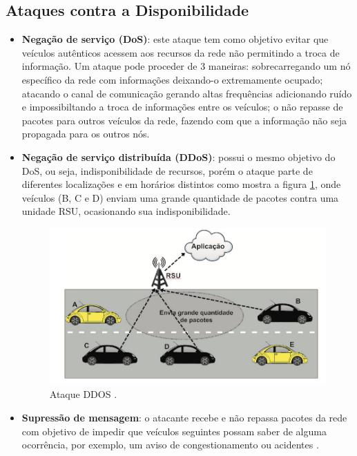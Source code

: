 \documentclass[
	12pt,				%
	oneside,			%
	a4paper,			%
	english,			%
	brazil				%
	]{abntex2ppgsi}
\begin{document}
\subsection{Ataques contra a Disponibilidade}
\begin{itemize}
	\item {\textbf{Negação de serviço (DoS)}: este ataque tem como objetivo evitar que veículos autênticos acessem aos recursos da rede não permitindo a troca de informação. Um ataque pode proceder de 3 maneiras: sobrecarregando um nó específico da rede com informações deixando-o extremamente ocupado; atacando o canal de comunicação gerando altas frequências adicionando ruído e impossibiltando a troca de informações entre os veículos; o não repasse de pacotes para outros veículos da rede, fazendo com que a informação não seja propagada para os outros nós}.
	
	\item {\textbf{Negação de serviço distribuída (DDoS)}: possui o mesmo objetivo do DoS, ou seja, indisponibilidade de recursos, porém o ataque parte de diferentes localizações e em horários distintos como mostra  a figura \ref{fig:ataqueddos}, onde veículos (B, C e D) enviam uma grande quantidade de pacotes contra uma unidade RSU, ocasionando sua indisponibilidade.}

\begin{figure}[h!]
	\centering
	\includegraphics [width=12cm] {images/ataqueddos.png}
	\caption{Ataque DDOS \cite{wanghamsegurancca}.}
	\label{fig:ataqueddos}
\end{figure}
	
	\item {\textbf{Supressão de mensagem}: o atacante recebe e não repassa pacotes da rede com objetivo de impedir que veículos seguintes possam saber de alguma ocorrência, por exemplo, um aviso de congestionamento ou acidentes \cite{tangade2013survey}.}		


\end{itemize}
\end{document}
